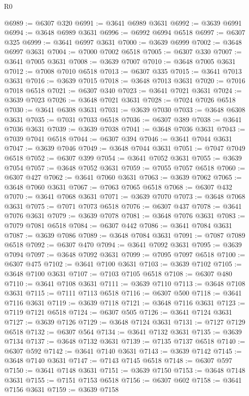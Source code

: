 \begin{lexlean}{R0}
\begin{coremodule}
@6989 := @6307 @320
@6991 := @3641 @6989 @3631
@6992 := @3639 @6991
@6994 := @3648 @6989 @3631
@6996 := @6992 @6994 @6518
@6997 := @6307 @325
@6999 := @3641 @6997 @3631
@7000 := @3639 @6999
@7002 := @3648 @6997 @3631
@7004 := @7000 @7002 @6518
@7005 := @6307 @330
@7007 := @3641 @7005 @3631
@7008 := @3639 @7007
@7010 := @3648 @7005 @3631
@7012 := @7008 @7010 @6518
@7013 := @6307 @335
@7015 := @3641 @7013 @3631
@7016 := @3639 @7015
@7018 := @3648 @7013 @3631
@7020 := @7016 @7018 @6518
@7021 := @6307 @340
@7023 := @3641 @7021 @3631
@7024 := @3639 @7023
@7026 := @3648 @7021 @3631
@7028 := @7024 @7026 @6518
@7030 := @3641 @6308 @3631
@7031 := @3639 @7030
@7033 := @3648 @6308 @3631
@7035 := @7031 @7033 @6518
@7036 := @6307 @389
@7038 := @3641 @7036 @3631
@7039 := @3639 @7038
@7041 := @3648 @7036 @3631
@7043 := @7039 @7041 @6518
@7044 := @6307 @394
@7046 := @3641 @7044 @3631
@7047 := @3639 @7046
@7049 := @3648 @7044 @3631
@7051 := @7047 @7049 @6518
@7052 := @6307 @399
@7054 := @3641 @7052 @3631
@7055 := @3639 @7054
@7057 := @3648 @7052 @3631
@7059 := @7055 @7057 @6518
@7060 := @6307 @427
@7062 := @3641 @7060 @3631
@7063 := @3639 @7062
@7065 := @3648 @7060 @3631
@7067 := @7063 @7065 @6518
@7068 := @6307 @432
@7070 := @3641 @7068 @3631
@7071 := @3639 @7070
@7073 := @3648 @7068 @3631
@7075 := @7071 @7073 @6518
@7076 := @6307 @437
@7078 := @3641 @7076 @3631
@7079 := @3639 @7078
@7081 := @3648 @7076 @3631
@7083 := @7079 @7081 @6518
@7084 := @6307 @442
@7086 := @3641 @7084 @3631
@7087 := @3639 @7086
@7089 := @3648 @7084 @3631
@7091 := @7087 @7089 @6518
@7092 := @6307 @470
@7094 := @3641 @7092 @3631
@7095 := @3639 @7094
@7097 := @3648 @7092 @3631
@7099 := @7095 @7097 @6518
@7100 := @6307 @475
@7102 := @3641 @7100 @3631
@7103 := @3639 @7102
@7105 := @3648 @7100 @3631
@7107 := @7103 @7105 @6518
@7108 := @6307 @480
@7110 := @3641 @7108 @3631
@7111 := @3639 @7110
@7113 := @3648 @7108 @3631
@7115 := @7111 @7113 @6518
@7116 := @6307 @500
@7118 := @3641 @7116 @3631
@7119 := @3639 @7118
@7121 := @3648 @7116 @3631
@7123 := @7119 @7121 @6518
@7124 := @6307 @505
@7126 := @3641 @7124 @3631
@7127 := @3639 @7126
@7129 := @3648 @7124 @3631
@7131 := @7127 @7129 @6518
@7132 := @6307 @564
@7134 := @3641 @7132 @3631
@7135 := @3639 @7134
@7137 := @3648 @7132 @3631
@7139 := @7135 @7137 @6518
@7140 := @6307 @592
@7142 := @3641 @7140 @3631
@7143 := @3639 @7142
@7145 := @3648 @7140 @3631
@7147 := @7143 @7145 @6518
@7148 := @6307 @597
@7150 := @3641 @7148 @3631
@7151 := @3639 @7150
@7153 := @3648 @7148 @3631
@7155 := @7151 @7153 @6518
@7156 := @6307 @602
@7158 := @3641 @7156 @3631
@7159 := @3639 @7158

\end{coremodule}
\end{lexlean}
